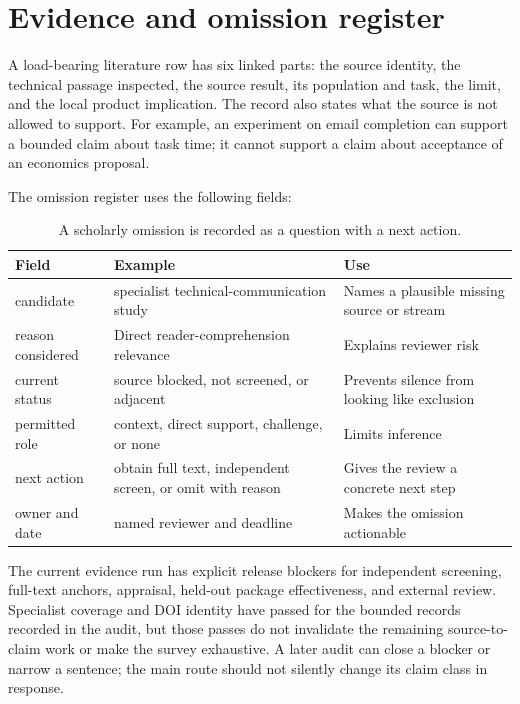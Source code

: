 \section{Evidence and omission register}
\label{sec:manual-evidence-register}

A load-bearing literature row has six linked parts: the source identity, the
technical passage inspected, the source result, its population and task, the
limit, and the local product implication. The record also states what the
source is not allowed to support. For example, an experiment on email
completion can support a bounded claim about task time; it cannot support a
claim about acceptance of an economics proposal.

The omission register uses the following fields:

\begin{table}[H]
\centering
\small
\begin{tabularx}{\textwidth}{@{}p{}p{}L@{}}
\toprule
Field & Example & Use \\
\midrule
candidate & specialist technical-communication study & Names a plausible
missing source or stream \\
reason considered & Direct reader-comprehension relevance & Explains reviewer risk \\
current status & source blocked, not screened, or adjacent & Prevents silence from
looking like exclusion \\
permitted role & context, direct support, challenge, or none & Limits inference \\
next action & obtain full text, independent screen, or omit with reason & Gives the
review a concrete next step \\
owner and date & named reviewer and deadline & Makes the omission actionable \\
\bottomrule
\end{tabularx}
\caption{A scholarly omission is recorded as a question with a next action.}
\label{tab:manual-omission}
\end{table}

The current evidence run has explicit release blockers for independent
screening, full-text anchors, appraisal, held-out package effectiveness, and
external review. Specialist coverage and DOI identity have passed for the
bounded records recorded in the audit, but those passes do not invalidate the
remaining source-to-claim work or make the survey exhaustive. A later audit can
close a blocker or narrow a sentence; the main route should not silently change
its claim class in response.

